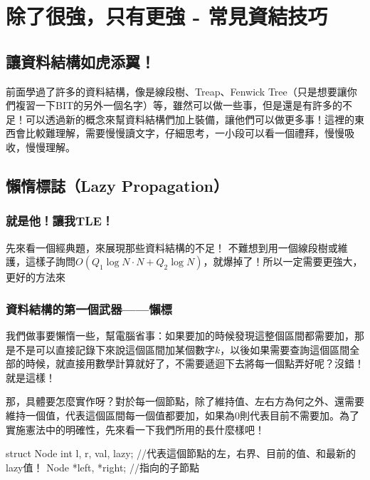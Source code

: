 \chapter{除了很強，只有更強 - 常見資結技巧}
	\section{讓資料結構如虎添翼！}
		前面學過了許多的資料結構，像是線段樹、Treap、Fenwick Tree（只是想要讓你們複習一下BIT的另外一個名字）等，雖然可以做一些事，但是還是有許多的不足！可以透過新的概念來幫資料結構們加上裝備，讓他們可以做更多事！這裡的東西會比較難理解，需要慢慢讀文字，仔細思考，一小段可以看一個禮拜，慢慢吸收，慢慢理解。
	\section{懶惰標誌（Lazy Propagation）}
		\subsection{就是他！讓我TLE！}
			先來看一個經典題，來展現那些資料結構的不足！
			不難想到用一個線段樹或維護，這樣子詢問$O(Q_1 \log N\cdot N + Q_2 \log N)$，就爆掉了！所以一定需要更強大，更好的方法來
		\subsection{資料結構的第一個武器——懶標}
			我們做事要懶惰一些，幫電腦省事：如果要加的時候發現這整個區間都需要加，那是不是可以直接記錄下來說這個區間加某個數字$k$，以後如果需要查詢這個區間全部的時候，就直接用數學計算就好了，不需要遞迴下去將每一個點弄好呢？沒錯！就是這樣！
			
			那，具體要怎麼實作呀？對於每一個節點，除了維持值、左右方為何之外、還需要維持一個值，代表這個區間每一個值都要加，如果為$0$則代表目前不需要加。為了實施憲法中的明確性，先來看一下我們所用的長什麼樣吧！
			\begin{C++}
struct Node{
	int l, r, val, lazy; //代表這個節點的左，右界、目前的值、和最新的lazy值！
	Node *left, *right; //指向的子節點
}
			\end{C++}

